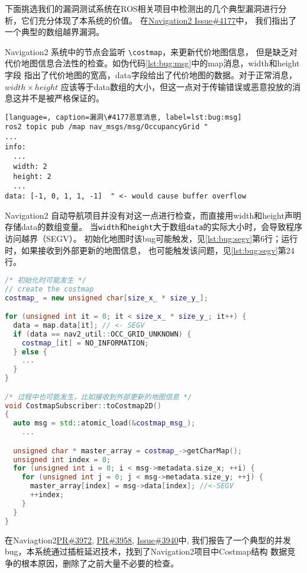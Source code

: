 下面挑选我们的漏洞测试系统在ROS相关项目中检测出的几个典型漏洞进行分析，它们充分体现了本系统的价值。
在\href{https://github.com/ros-planning/navigation2/issues/4177}{Navigation2 Issue\#4177}中，
我们指出了一个典型的数组越界漏洞。

Navigation2 系统中的节点会监听 \texttt{\textbackslash costmap}，来更新代价地图信息，
但是缺乏对代价地图信息合法性的检查。如伪代码\ref{lst:bug:msg}中的map消息，width和height字段
指出了代价地图的宽高，data字段给出了代价地图的数据。对于正常消息，$width\times height$ 
应该等于data数组的大小，但这一点对于传输错误或恶意投放的消息这并不是被严格保证的。

\begin{lstlisting}[language=, caption=漏洞\#4177恶意消息, label=lst:bug:msg]
ros2 topic pub /map nav_msgs/msg/OccupancyGrid "
...
info:
  ...
  width: 2
  height: 2
  ...
data: [-1, 0, 1, 1, -1]  " <- would cause buffer overflow
\end{lstlisting}

Navigation2 自动导航项目并没有对这一点进行检查，而直接用width和height声明存储data的数组变量。
当\texttt{width}和\texttt{height}大于数组\texttt{data}的实际大小时，会导致程序访问越界（SEGV）。
初始化地图时该bug可能触发，见\ref{lst:bug:segv}第6行；运行时，如果接收到外部更新的地图信息，
也可能触发该问题，见\ref{lst:bug:segv}第24行。

\begin{lstlisting}[language=C++, caption=漏洞\#4177问题代码, label=lst:bug:segv]
/* 初始化时可能发生 */
// create the costmap
costmap_ = new unsigned char[size_x_ * size_y_];

for (unsigned int it = 0; it < size_x_ * size_y_; it++) {
  data = map.data[it]; // <- SEGV
  if (data == nav2_util::OCC_GRID_UNKNOWN) {
    costmap_[it] = NO_INFORMATION;
  } else {
    ...
  }
}

/* 过程中也可能发生，比如接收到外部更新的地图信息 */
void CostmapSubscriber::toCostmap2D()
{
  auto msg = std::atomic_load(&costmap_msg_);
	...

  unsigned char * master_array = costmap_->getCharMap();
  unsigned int index = 0;
  for (unsigned int i = 0; i < msg->metadata.size_x; ++i) {
    for (unsigned int j = 0; j < msg->metadata.size_y; ++j) {
      master_array[index] = msg->data[index]; //<-SEGV
      ++index;
    }
  }
}
\end{lstlisting}

在Naviagtion2\href{https://github.com/ros-planning/navigation2/pull/3958}{PR\#3972}, 
\href{https://github.com/ros-planning/navigation2/pull/3958}{PR\#3958}, 
\href{https://github.com/ros-planning/navigation2/issues/3940}{Issue\#3940}中, 
我们报告了一个典型的并发bug，本系统通过插桩延迟技术，找到了Navigation2项目中Costmap结构
数据竞争的根本原因，删除了之前大量不必要的检查。


